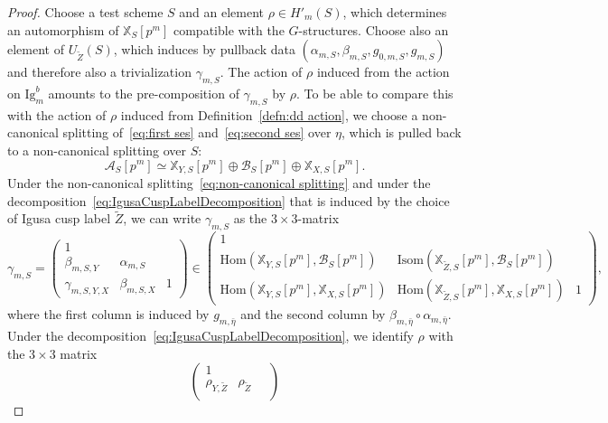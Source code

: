 \documentclass[letterpaper,11pt]{amsart}
\begin{document}
\begin{proof}
Choose a test scheme $S$ and an element $\rho\in H'_m(S)$, which determines an automorphism of $\mathbb{X}_{S}[p^m]$ compatible with the $G$-structures. Choose also an element of $U_{\widetilde{Z}}(S)$, which induces by pullback data $(\alpha_{m,S}, \beta_{m,S}, g_{0,m,S}, g_{m,S})$ and therefore also a trivialization $\gamma_{m,S}$. The action of $\rho$ induced from the action on $\mathrm{Ig}^b_m$ amounts to the pre-composition of $\gamma_{m,S}$ by $\rho$. To be able to compare this with the action of $\rho$ induced from Definition~\ref{defn:dd action},  we choose a non-canonical splitting of~\eqref{eq:first ses} and~\eqref{eq:second ses} over $\eta$, which is pulled back to a non-canonical splitting over $S$:
\begin{equation}\label{eq:non-canonical splitting}
\mathcal{A}_{S}[p^m]\simeq \mathbb{X}_{Y,S}[p^m]\oplus \mathcal{B}_{S}[p^m]\oplus \mathbb{X}_{X,S}[p^m].
\end{equation} 
Under the non-canonical splitting~\eqref{eq:non-canonical splitting} and under the decomposition~\eqref{eq:IgusaCuspLabelDecomposition} that is induced by the choice of Igusa cusp label $\widetilde{Z}$, we can write $\gamma_{m,S}$ as the $3\times 3$-matrix
\[
\gamma_{m,S} = \begin{pmatrix} 1 & \ & \ \\
\beta_{m,S, Y} & \alpha_{m,S} & \ \\
\gamma_{m,S, Y,X} & \beta_{m,S, X}& 1
\end{pmatrix} \in 
\begin{pmatrix}
    1 & \ & \ \\ 
    \mathrm{Hom}\left(\mathbb{X}_{Y,S}[p^m], \mathcal{B}_{S}[p^m]\right) & \mathrm{Isom}\left( \mathbb{X}_{\widetilde{Z},S}[p^m], \mathcal{B}_{S}[p^m]\right)& \ \\
    \mathrm{Hom}\left(\mathbb{X}_{Y, S}[p^m], \mathbb{X}_{X, S}[p^m]\right)& \mathrm{Hom}\left(\mathbb{X}_{\widetilde{Z},S}[p^m], \mathbb{X}_{X, S}[p^m]\right) & 1
\end{pmatrix},
\]
where the first column is induced by $g_{m,\bar{\eta}}$ and the second column by $\beta_{m,\bar{\eta}}\circ \alpha_{m,\bar{\eta}}$. Under the decomposition~\eqref{eq:IgusaCuspLabelDecomposition}, we identify $\rho$ with the $3\times3$ matrix
\begin{equation}\label{eq:matrix of rhoZ}
 \begin{pmatrix}
        1& \ &\ \\
        \rho_{Y, \widetilde{Z}} & \rho_{\widetilde{Z}}& \ \\

\end{pmatrix}
\end{equation}
\end{proof}
\end{document}
